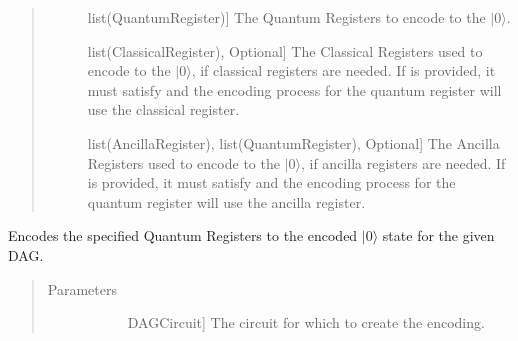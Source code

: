 \documentclass[letterpaper,10pt,english]{sphinxmanual}
\begin{document}
\begin{fulllineitems}
\begin{fulllineitems}
\begin{quote}
\begin{description}
\begin{description}
\item[{}] \leavevmode{[}list(QuantumRegister){]}
The Quantum Registers to encode to the \(|0\rangle\).

\item[{}] \leavevmode{[}list(ClassicalRegister), Optional{]}
The Classical Registers used to encode to the \(|0\rangle\), if classical registers are needed. If  is provided, it must satisfy  and the encoding process for the  quantum register will use the  classical register.

\item[{}] \leavevmode{[}list(AncillaRegister), list(QuantumRegister), Optional{]}
The Ancilla Registers used to encode to the \(|0\rangle\), if ancilla registers are needed. If  is provided, it must satisfy  and the encoding process for the  quantum register will use the  ancilla register.

\end{description}

\end{description}\end{quote}

\end{fulllineitems}


\begin{fulllineitems}
\label{\detokenize{Base:BaseFaultTolerance.Encoder.getEncoderDag}}
Encodes the specified Quantum Registers to the encoded \(|0\rangle\) state for the given DAG.
\begin{quote}\begin{description}
\item[{Parameters}] \leavevmode\begin{description}
\item[{}] \leavevmode{[}DAGCircuit{]}
The circuit for which to create the encoding.


\end{description}
\end{description}
\end{quote}
\end{fulllineitems}
\end{fulllineitems}
\end{document}
